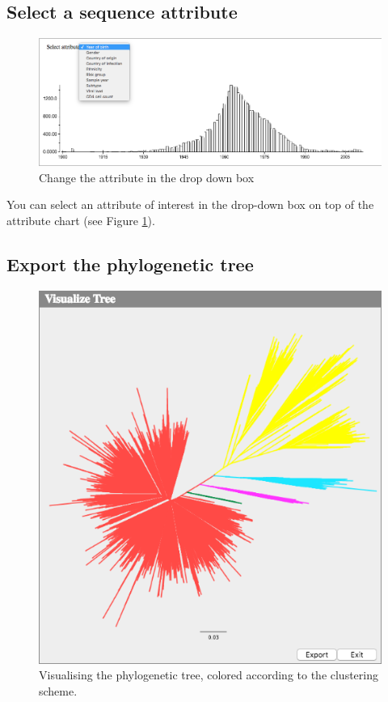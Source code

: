 \documentclass[a4paper, 11pt]{article} %
\begin{document}
\subsection{Select a sequence attribute}
\begin{figure}[H]
\centering
\includegraphics[scale=0.38]{images/change_attr.PNG}
\vspace{-0.75cm}
\caption{Change the attribute in the drop down box}
\label{fig:change_attr}
\end{figure}
You can select an attribute of interest in the drop-down box on top of the attribute chart (see Figure \ref{fig:change_attr}).


\subsection{Export the phylogenetic tree}
\begin{figure}[H]
\centering
\includegraphics[scale=0.50]{images/view_tree.PNG}
\vspace{-0.25cm}
\caption{Visualising the phylogenetic tree, colored according to the clustering scheme.}
\label{fig:view_tree}
\end{figure}
\end{document}
